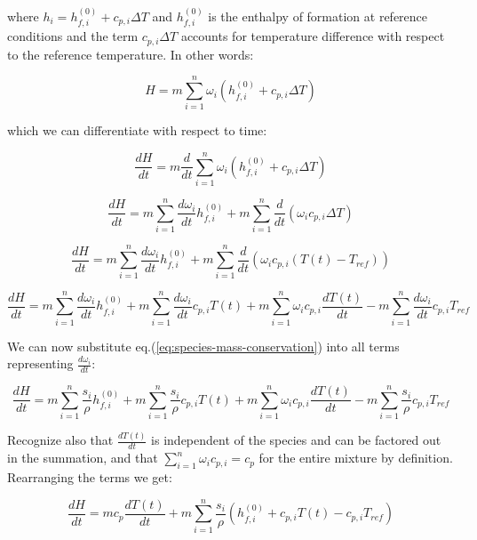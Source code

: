 \documentclass[10pt]{article}
\begin{document}
where $h_i = h_{f,i}^{(0)} + c_{p,i} \Delta T$ and $h_{f,i}^{(0)}$ is the enthalpy of formation at reference conditions and the term $c_{p,i} \Delta T$ accounts for temperature difference with respect to the reference temperature. In other words:

\begin{equation}
H = m \sum_{i=1}^n \omega_i ( h_{f,i}^{(0)} + c_{p,i} \Delta T )
\end{equation}

which we can differentiate with respect to time:

\begin{equation*}
\frac{dH}{dt} = m \frac{d}{dt} \sum_{i=1}^n \omega_i ( h_{f,i}^{(0)} + c_{p,i} \Delta T )
\end{equation*}

\begin{equation*}
\frac{dH}{dt} = m \sum_{i=1}^n  \frac{d \omega_i}{dt}  h_{f,i}^{(0)}  + m \sum_{i=1}^n \frac{d}{dt} ( \omega_i c_{p,i} \Delta T )
\end{equation*}

\begin{equation*}
\frac{dH}{dt} = m \sum_{i=1}^n  \frac{d \omega_i}{dt}  h_{f,i}^{(0)}  + m \sum_{i=1}^n \frac{d}{dt} ( \omega_i c_{p,i} (T(t) - T_{ref}) )
\end{equation*}

\begin{equation*}
\frac{dH}{dt} = m \sum_{i=1}^n  \frac{d \omega_i}{dt}  h_{f,i}^{(0)}  + m \sum_{i=1}^n \frac{d \omega_i}{dt} c_{p,i} T(t) + m \sum_{i=1}^n \omega_i c_{p,i} \frac{d T(t)}{dt}  - m \sum_{i=1}^n \frac{d \omega_i}{dt} c_{p,i} T_{ref}
\end{equation*}

We can now substitute eq.(\ref{eq:species-mass-conservation}) into all terms  representing $\frac{d \omega_i}{dt}$:

\begin{equation*}
\frac{dH}{dt} = m \sum_{i=1}^n  \frac{s_i}{\rho}  h_{f,i}^{(0)}  + m \sum_{i=1}^n \frac{s_i}{\rho} c_{p,i} T(t) + m \sum_{i=1}^n \omega_i c_{p,i} \frac{d T(t)}{dt}  - m \sum_{i=1}^n \frac{s_i}{\rho} c_{p,i} T_{ref}
\end{equation*}

Recognize also that $\frac{d T(t)}{dt}$ is independent of the species and can be factored out in the summation, and that $\sum_{i=1}^n \omega_i c_{p,i} = c_p$ for the entire mixture by definition. Rearranging the terms we get:

\begin{equation*}
\frac{dH}{dt} = m c_{p} \frac{d T(t)}{dt} + m \sum_{i=1}^n  \frac{s_i}{\rho}  ( h_{f,i}^{(0)} + c_{p,i} T(t)  - c_{p,i} T_{ref})
\end{equation*}
\end{document}
